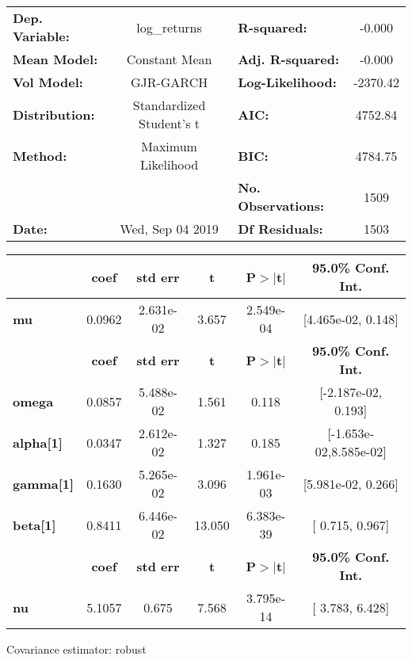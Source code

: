 \begin{center}
\begin{tabular}{lclc}
\toprule
\textbf{Dep. Variable:} &       log\_returns       & \textbf{  R-squared:         } &    -0.000   \\
\textbf{Mean Model:}    &      Constant Mean       & \textbf{  Adj. R-squared:    } &    -0.000   \\
\textbf{Vol Model:}     &        GJR-GARCH         & \textbf{  Log-Likelihood:    } &   -2370.42  \\
\textbf{Distribution:}  & Standardized Student's t & \textbf{  AIC:               } &    4752.84  \\
\textbf{Method:}        &    Maximum Likelihood    & \textbf{  BIC:               } &    4784.75  \\
\textbf{}               &                          & \textbf{  No. Observations:  } &    1509     \\
\textbf{Date:}          &     Wed, Sep 04 2019     & \textbf{  Df Residuals:      } &    1503     \\
\bottomrule
\end{tabular}
\begin{tabular}{lccccc}
            & \textbf{coef} & \textbf{std err} & \textbf{t} & \textbf{P$> |$t$|$} & \textbf{95.0\% Conf. Int.}  \\
\midrule
\textbf{mu} &       0.0962  &    2.631e-02     &     3.657  &      2.549e-04       &    [4.465e-02,  0.148]      \\
                  & \textbf{coef} & \textbf{std err} & \textbf{t} & \textbf{P$> |$t$|$} & \textbf{95.0\% Conf. Int.}  \\
\midrule
\textbf{omega}    &       0.0857  &    5.488e-02     &     1.561  &          0.118       &    [-2.187e-02,  0.193]     \\
\textbf{alpha[1]} &       0.0347  &    2.612e-02     &     1.327  &          0.185       &   [-1.653e-02,8.585e-02]    \\
\textbf{gamma[1]} &       0.1630  &    5.265e-02     &     3.096  &      1.961e-03       &    [5.981e-02,  0.266]      \\
\textbf{beta[1]}  &       0.8411  &    6.446e-02     &    13.050  &      6.383e-39       &     [  0.715,  0.967]       \\
            & \textbf{coef} & \textbf{std err} & \textbf{t} & \textbf{P$> |$t$|$} & \textbf{95.0\% Conf. Int.}  \\
\midrule
\textbf{nu} &       5.1057  &        0.675     &     7.568  &      3.795e-14       &     [  3.783,  6.428]       \\
\bottomrule
\end{tabular}
\end{center}

Covariance estimator: robust
